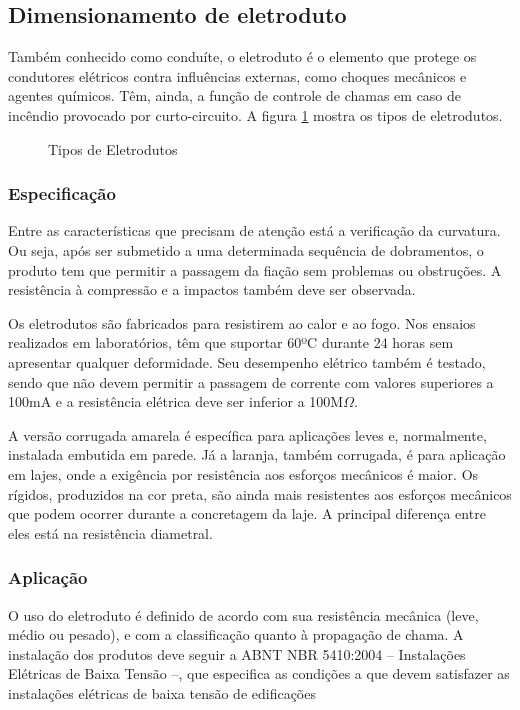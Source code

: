 \subsection{Dimensionamento de eletroduto}

Também conhecido como conduíte, o eletroduto é o elemento que protege os condutores elétricos contra influências externas, como choques mecânicos e agentes químicos. Têm, ainda, a função de controle de chamas em caso de incêndio provocado por curto-circuito. 
A figura \ref{eletrodutos} mostra os tipos de eletrodutos.

\begin{figure}[h]
	\centering
	\caption{Tipos de Eletrodutos}
	\label{eletrodutos}
\end{figure}

\subsubsection{Especificação}

Entre as características que precisam de atenção está a verificação da curvatura. Ou seja, após ser submetido a uma determinada sequência de dobramentos, o produto tem que permitir a passagem da fiação sem problemas ou obstruções. A resistência à compressão e a impactos também deve ser observada.

Os eletrodutos são fabricados para resistirem ao calor e ao fogo. Nos ensaios realizados em laboratórios, têm que suportar 60ºC durante 24 horas sem apresentar qualquer deformidade. Seu desempenho elétrico também é testado, sendo que não devem permitir a passagem de corrente com valores superiores a 100mA e a resistência elétrica deve ser inferior a 100M$\Omega$.

A versão corrugada amarela é específica para aplicações leves e, normalmente, instalada embutida em parede. Já a laranja, também corrugada, é para aplicação em lajes, onde a exigência por resistência aos esforços mecânicos é maior. Os rígidos, produzidos na cor preta, são ainda mais resistentes aos esforços mecânicos que podem ocorrer durante a concretagem da laje. A principal diferença entre eles está na resistência diametral.

\subsubsection{Aplicação}

O uso do eletroduto é definido de acordo com sua resistência mecânica (leve, médio ou pesado), e com a classificação quanto à propagação de chama. A instalação dos produtos deve seguir a ABNT NBR 5410:2004 – Instalações Elétricas de Baixa Tensão –, que especifica as condições a que devem satisfazer as instalações elétricas de baixa tensão de edificações

